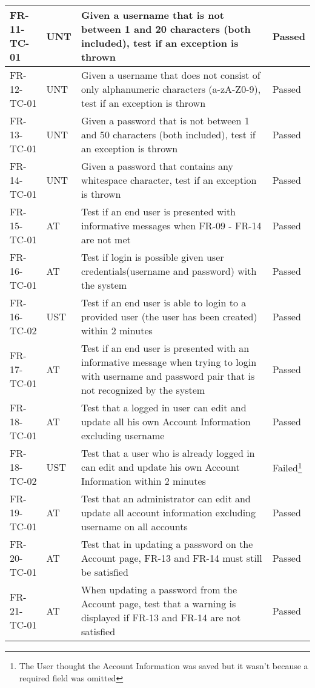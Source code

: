 \documentclass[../report.tex]{subfiles}
\begin{document}
\begin{longtable}{|L{2.1cm}|L{0.8cm}|L{9cm}|L{1.2cm}|}
FR-11-TC-01&UNT&Given a username that is not between 1 and 20 characters (both included), test if an exception is thrown&Passed  \\ \hline
FR-12-TC-01&UNT&Given a username that does not consist of only alphanumeric characters (a-zA-Z0-9), test if an exception is thrown&Passed  \\ \hline
FR-13-TC-01&UNT&Given a password that is not between 1 and 50 characters (both included), test if an exception is thrown&Passed  \\ \hline
FR-14-TC-01&UNT&Given a password that contains any whitespace character, test if an exception is thrown&Passed  \\ \hline
FR-15-TC-01&AT&Test if an end user is presented with informative messages when FR-09 - FR-14 are not met&Passed  \\ \hline
FR-16-TC-01&AT&Test if login is possible given user credentials(username and password) with the system&Passed  \\ \hline
FR-16-TC-02&UST&Test if an end user is able to login to a provided user (the user has been created) within 2 minutes&Passed  \\ \hline
FR-17-TC-01&AT&Test if an end user is presented with an informative message when trying to login with username and password pair that is not recognized by the system&Passed  \\ \hline
FR-18-TC-01&AT&Test that a logged in user can edit and update all his own Account Information excluding username&Passed  \\ \hline
FR-18-TC-02&UST&Test that a user who is already logged in can edit and update his own Account Information within 2 minutes&Failed\footnote{The User thought the Account Information was saved but it wasn't because a required field was omitted}  \\ \hline
FR-19-TC-01&AT&Test that an administrator can edit and update all account information excluding username on all accounts&Passed  \\ \hline
FR-20-TC-01&AT&Test that in updating a password on the Account page, FR-13 and FR-14 must still be satisfied&Passed  \\ \hline
FR-21-TC-01&AT&When updating a password from the Account page, test that a warning is displayed if FR-13 and FR-14 are not satisfied&Passed  \\ \hline

\end{longtable}
\end{document}
